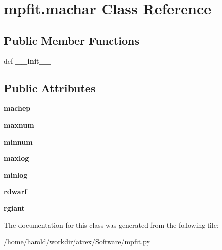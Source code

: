 \hypertarget{classmpfit_1_1machar}{\section{mpfit.\-machar Class Reference}
\label{classmpfit_1_1machar}
}
\subsection*{Public Member Functions}
\begin{DoxyCompactItemize}
\item 
\hypertarget{classmpfit_1_1machar_a107a955a7c4b29ad883a7c95a564479b}{def {\bfseries \-\_\-\-\_\-init\-\_\-\-\_\-}}\label{classmpfit_1_1machar_a107a955a7c4b29ad883a7c95a564479b}

\end{DoxyCompactItemize}
\subsection*{Public Attributes}
\begin{DoxyCompactItemize}
\item 
\hypertarget{classmpfit_1_1machar_a3f4c542f8c12eadb7fd7899b85e7418f}{{\bfseries machep}}\label{classmpfit_1_1machar_a3f4c542f8c12eadb7fd7899b85e7418f}

\item 
\hypertarget{classmpfit_1_1machar_ab572a985f979d3940525b5867deafb86}{{\bfseries maxnum}}\label{classmpfit_1_1machar_ab572a985f979d3940525b5867deafb86}

\item 
\hypertarget{classmpfit_1_1machar_a81a54c7e41c2ef0471983156b9d18b19}{{\bfseries minnum}}\label{classmpfit_1_1machar_a81a54c7e41c2ef0471983156b9d18b19}

\item 
\hypertarget{classmpfit_1_1machar_a038d6337e708014cfb3efedc9fdb4fc8}{{\bfseries maxlog}}\label{classmpfit_1_1machar_a038d6337e708014cfb3efedc9fdb4fc8}

\item 
\hypertarget{classmpfit_1_1machar_af01c85a38dbf4a94ae46170e4306baf9}{{\bfseries minlog}}\label{classmpfit_1_1machar_af01c85a38dbf4a94ae46170e4306baf9}

\item 
\hypertarget{classmpfit_1_1machar_ae0d8c6eebbf9deca09bcbc893d5e0428}{{\bfseries rdwarf}}\label{classmpfit_1_1machar_ae0d8c6eebbf9deca09bcbc893d5e0428}

\item 
\hypertarget{classmpfit_1_1machar_ab78cc8c341cd8a39922aa13341be9df9}{{\bfseries rgiant}}\label{classmpfit_1_1machar_ab78cc8c341cd8a39922aa13341be9df9}

\end{DoxyCompactItemize}


The documentation for this class was generated from the following file\-:\begin{DoxyCompactItemize}
\item 
/home/harold/workdir/atrex/\-Software/mpfit.\-py\end{DoxyCompactItemize}
